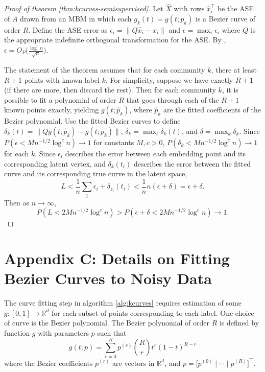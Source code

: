 \documentclass[
  12pt,
]{article}
\theoremstyle{definition}
\theoremstyle{definition}
\theoremstyle{definition}
\theoremstyle{definition}
\theoremstyle{remark}
\begin{document}
\begin{proof}[Proof of theorem \ref{thm:kcurves-semisupervised}]
Let $\hat{X}$ with rows $\hat{x}_i^\top$ be the ASE of $A$ drawn from an MBM in which each $g_k(t) = g(t; p_k)$ is a Bezier curve of order $R$. 
Define the ASE error as $\epsilon_i = \|Q \hat{x}_i - x_i\|$ and $\epsilon = \max_i \epsilon_i$ where $Q$ is the appropriate indefinite orthogonal transformation for the ASE. 
By \citet{rubindelanchy2017statistical}, $\epsilon = O_P \bigg(\frac{\log^c n}{\sqrt{n}} \bigg)$. 

The statement of the theorem assumes that for each community $k$, there at least $R + 1$ points with known label $k$. 
For simplicity, suppose we have exactly $R + 1$ (if there are more, then discard the rest). 
Then for each community $k$, it is possible to fit a polynomial of order $R$ that goes through each of the $R + 1$ known points exactly, yielding $g(t; \hat{p}_k)$, where $\hat{p}_k$ are the fitted coefficients of the Bezier polynomial. 
Use the fitted Bezier curves to define $\delta_k(t) = \|Q g(t; \hat{p}_k) - g(t; p_k)\|$, $\delta_k = \max_t \delta_k(t)$, and $\delta = \max_k \delta_k$. 
Since $P(\epsilon < M n^{-1/2} \log^c n) \to 1$ for constants $M, c > 0$, 
$P(\delta_k < M n^{-1/2} \log^c n) \to 1$ for each $k$. 
Since $\epsilon_i$ describes the error between each embedding point and its corresponding latent vertex, and $\delta_k(t_i)$ describes the error between the fitted curve and its corresponding true curve in the latent space, 
$$L < \frac{1}{n} \sum_i \epsilon_i + \delta_{z_i}(t_i) < \frac{1}{n} n (\epsilon + \delta) = \epsilon + \delta.$$ 
Then as $n \to \infty$, 
$$P(L < 2 M n^{-1/2} \log^c n) > P(\epsilon + \delta < 2 M n^{-1/2} \log^c n) \to 1.$$
\end{proof}

\newpage

\section{Appendix C: Details on Fitting Bezier Curves to Noisy Data}

The curve fitting step in algorithm \ref{alg:kcurves} requires estimation of some \(g: [0, 1] \to \mathbb{R}^d\) for each subset of points corresponding to each label.
One choice of curve is the Bezier polynomial.
The Bezier polynomial of order \(R\) is defined by function \(g\) with parameters \(p\) such that
\[g(t; p) = \sum_{r=0}^R p^{(r)} \binom{R}{r} t^r (1-t)^{R-r}\]
where the Bezier coefficients \(p^{(r)}\) are vectors in \(\mathbb{R}^d\), and \(p = \Big[ p^{(0)} \mid \cdots \mid p^{(R)} \Big]^\top\).
\end{document}
